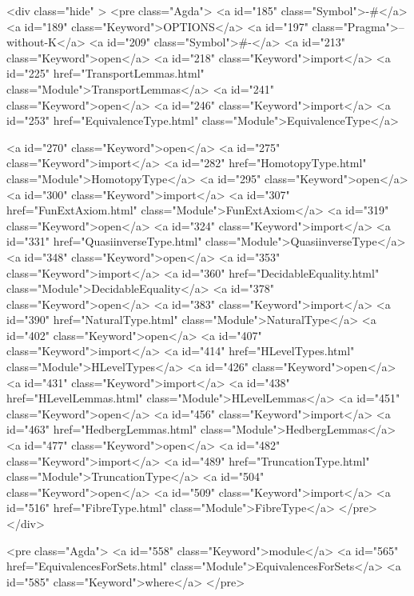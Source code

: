   <div class="hide" >
<pre class="Agda">
<a id="185" class="Symbol">{-#</a> <a id="189" class="Keyword">OPTIONS</a> <a id="197" class="Pragma">--without-K</a> <a id="209" class="Symbol">#-}</a>
<a id="213" class="Keyword">open</a> <a id="218" class="Keyword">import</a> <a id="225" href="TransportLemmas.html" class="Module">TransportLemmas</a>
<a id="241" class="Keyword">open</a> <a id="246" class="Keyword">import</a> <a id="253" href="EquivalenceType.html" class="Module">EquivalenceType</a>

<a id="270" class="Keyword">open</a> <a id="275" class="Keyword">import</a> <a id="282" href="HomotopyType.html" class="Module">HomotopyType</a>
<a id="295" class="Keyword">open</a> <a id="300" class="Keyword">import</a> <a id="307" href="FunExtAxiom.html" class="Module">FunExtAxiom</a>
<a id="319" class="Keyword">open</a> <a id="324" class="Keyword">import</a> <a id="331" href="QuasiinverseType.html" class="Module">QuasiinverseType</a>
<a id="348" class="Keyword">open</a> <a id="353" class="Keyword">import</a> <a id="360" href="DecidableEquality.html" class="Module">DecidableEquality</a>
<a id="378" class="Keyword">open</a> <a id="383" class="Keyword">import</a> <a id="390" href="NaturalType.html" class="Module">NaturalType</a>
<a id="402" class="Keyword">open</a> <a id="407" class="Keyword">import</a> <a id="414" href="HLevelTypes.html" class="Module">HLevelTypes</a>
<a id="426" class="Keyword">open</a> <a id="431" class="Keyword">import</a> <a id="438" href="HLevelLemmas.html" class="Module">HLevelLemmas</a>
<a id="451" class="Keyword">open</a> <a id="456" class="Keyword">import</a> <a id="463" href="HedbergLemmas.html" class="Module">HedbergLemmas</a>
<a id="477" class="Keyword">open</a> <a id="482" class="Keyword">import</a> <a id="489" href="TruncationType.html" class="Module">TruncationType</a>
<a id="504" class="Keyword">open</a> <a id="509" class="Keyword">import</a> <a id="516" href="FibreType.html" class="Module">FibreType</a>
</pre>
</div>

<pre class="Agda">
<a id="558" class="Keyword">module</a> <a id="565" href="EquivalencesForSets.html" class="Module">EquivalencesForSets</a> <a id="585" class="Keyword">where</a>
</pre>

